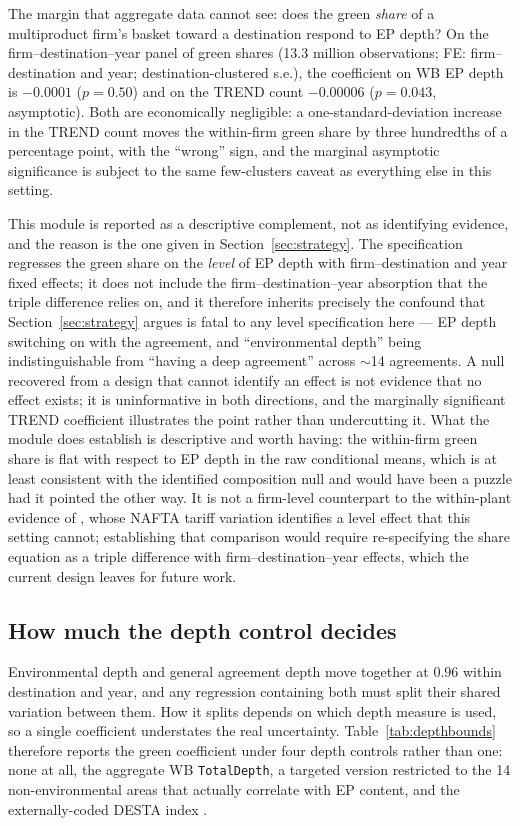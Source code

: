 \documentclass[12pt]{article}
\begin{document}
The margin that aggregate data cannot see: does the green \emph{share} of a
multiproduct firm's basket toward a destination respond to EP depth? On the
firm--destination--year panel of green shares (13.3 million observations; FE:
firm--destination and year; destination-clustered s.e.), the coefficient on WB EP
depth is $-0.0001$ ($p=0.50$) and on the TREND count $-0.00006$ ($p=0.043$,
asymptotic). Both are economically negligible: a one-standard-deviation increase in
the TREND count moves the within-firm green share by three hundredths of a percentage
point, with the ``wrong'' sign, and the marginal asymptotic significance is subject to
the same few-clusters caveat as everything else in this setting.

This module is reported as a descriptive complement, not as identifying evidence, and
the reason is the one given in Section~\ref{sec:strategy}. The specification regresses
the green share on the \emph{level} of EP depth with firm--destination and year fixed
effects; it does not include the firm--destination--year absorption that the triple
difference relies on, and it therefore inherits precisely the confound that
Section~\ref{sec:strategy} argues is fatal to any level specification here --- EP depth
switching on with the agreement, and ``environmental depth'' being indistinguishable
from ``having a deep agreement'' across $\sim$14 agreements. A null recovered from a
design that cannot identify an effect is not evidence that no effect exists; it is
uninformative in both directions, and the marginally significant TREND coefficient
illustrates the point rather than undercutting it. What the module does establish is
descriptive and worth having: the within-firm green share is flat with respect to EP
depth in the raw conditional means, which is at least consistent with the identified
composition null and would have been a puzzle had it pointed the other way. It is not
a firm-level counterpart to the within-plant evidence of \citet{cherniwchan2017}, whose
NAFTA tariff variation identifies a level effect that this setting cannot; establishing
that comparison would require re-specifying the share equation as a triple difference
with firm--destination--year effects, which the current design leaves for future work.

\subsection{How much the depth control decides}

Environmental depth and general agreement depth move together at $0.96$ within
destination and year, and any regression containing both must split their shared
variation between them. How it splits depends on which depth measure is used, so a single
coefficient understates the real uncertainty. Table~\ref{tab:depthbounds} therefore
reports the green coefficient under four depth controls rather than one: none at all, the
aggregate WB \texttt{TotalDepth}, a targeted version restricted to the 14 non-environmental
areas that actually correlate with EP content, and the externally-coded DESTA index
\citep{dur2014}.
\end{document}
